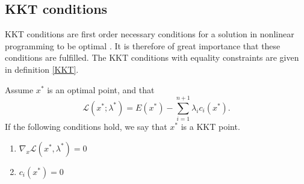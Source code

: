\subsection{KKT conditions}
KKT conditions are first order necessary conditions for a solution in nonlinear programming to be optimal \cite{KKT}. It is therefore of great importance that these conditions are fulfilled. The KKT conditions with equality constraints are given in definition \ref{KKT}.

\begin{definition} \label{KKT} \cite{thm2}
Assume $x^*$ is an optimal point, and that
\[ \mathcal{L}(x^*;\lambda^*) = E(x^*)- \sum\limits_{i=1}^{n+1}\lambda_i c_i(x^*).\]
If the following conditions hold, we say that $x^*$ is a KKT point.

\begin{enumerate}
\item $\nabla_x \mathcal{L}(x^*,\lambda^*) = 0$
\item $c_i(x^*) = 0$
\end{enumerate}
\end{definition}


